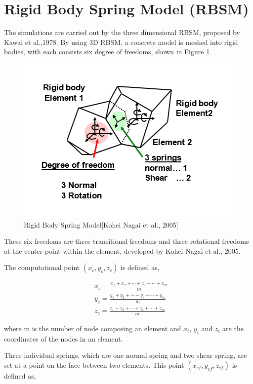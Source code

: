 \section{Rigid Body Spring Model (RBSM)}

The simulations are carried out by the three dimensional RBSM, proposed by Kawai et al.,1978\cite{Kawai}. By using 3D RBSM, a concrete model is meshed into rigid bodies, with each consists six degree of freedoms, shown in Figure \ref{fig:RBSM}.

\begin{figure}[ht!]
\centering
\includegraphics[width=.6\linewidth]{Files/Background/RBSM_1.png}
  \caption{Rigid Body Spring Model[Kohei Nagai et al., 2005]}
  \label{fig:RBSM}
\end{figure}

These six freedoms are three transitional freedoms and three rotational freedoms at the center point within the element, developed by Kohei Nagai et al., 2005\cite{Nagai}.

The computational point $(x_c, y_c, z_c)$ is defined as,

\begin{equation}
  \begin{aligned}
  &x_c=\frac{x_1 + x_2 + \cdots + x_i + \cdots + x_m}{m} \\
  &y_c=\frac{y_1 + y_2 + \cdots + y_i + \cdots + y_m}{m} \\
  &z_c=\frac{z_1 + z_2 + \cdots + z_i + \cdots + z_m}{m}
  \end{aligned}
\end{equation}

where m is the number of node composing an element and $x_i$, $y_i$ and $z_i$ are the coordinates of the nodes in an element.

Three individual springs, which are one normal spring and two shear spring, are set at a point on the face between two elements. This point $(x_{cf}, y_{cf}, z_{cf})$ is defined as,

